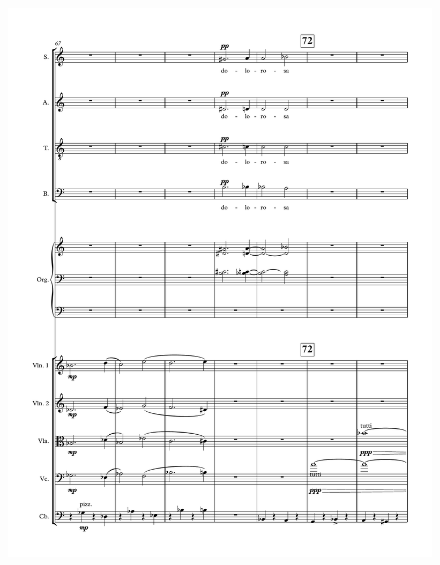 \begin{figure}[htbp]
    \centering
	\includegraphics[width=6.5in]{figures/Stabat_Mater_13.pdf}
\end{figure}

